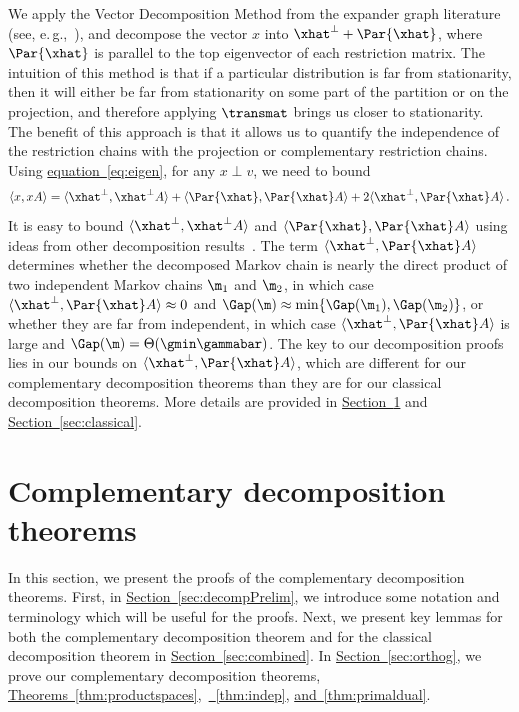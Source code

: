 \documentclass[11pt]{article}
\providecommand{\eg}{e.\,g.}
\providecommand{\expref}[2]{\texorpdfstring{\hyperref[#2]{#1~\ref{#2}}}{#1~\ref{#2}}}
\providecommand{\expeqref}[2]{\texorpdfstring{\hyperref[#2]{#1~\eqref{#2}}}{#1~\eqref{#2}}}
\providecommand{\Perp}[1]{#1^{\perp}}
\begin{document}
We apply the Vector Decomposition Method from the expander graph 
literature (see, \eg,~\cite{RVW, expander-book}), and decompose the 
vector $x$ into $\Perp{\xhat}+\Par{\xhat}$, where $\Par{\xhat}$ is 
parallel to the top eigenvector of each restriction matrix.  The 
intuition of this method is that if a particular distribution is far 
from stationarity, then it will either be far from stationarity on some 
part of the partition or on the projection, and therefore applying 
$\transmat$ brings us closer to stationarity. The benefit of this 
approach is that it allows us to quantify the independence of the 
restriction chains with the projection or complementary restriction chains.
Using 
\expeqref{equation}{eq:eigen}, for any $x\perp v$, we need to bound 
\begin{equation}\label{eq:split}
\langle x, xA\rangle = \langle \Perp{\xhat},\Perp{\xhat}A\rangle + 
\langle\Par{\xhat},\Par{\xhat}A\rangle + 2\langle \Perp{\xhat},\Par{\xhat}A\rangle\,.
\end{equation}
It is easy to bound $\langle \Perp{\xhat},\Perp{\xhat}A\rangle$ and 
$\langle\Par{\xhat},\Par{\xhat}A\rangle$ using ideas from other 
decomposition results~\cite{jstv04, MR00}. The term $\langle 
\Perp{\xhat},\Par{\xhat}A\rangle$ determines whether the decomposed 
Markov chain is nearly the direct product of two independent Markov 
chains $\m_1$ and $\m_2$, in which case $\langle 
\Perp{\xhat},\Par{\xhat}A\rangle\approx0$ and $\Gap(\m)\approx 
\min\{\Gap(\m_1),\Gap(\m_2)\}$, or whether they are far from 
independent, in which case $\langle \Perp{\xhat},\Par{\xhat}A\rangle$ 
is large and $\Gap(\m)=\Theta(\gmin \gammabar)$.  The key to our 
decomposition proofs lies in our bounds on $\langle 
\Perp{\xhat},\Par{\xhat}A\rangle$, which are different for our 
complementary decomposition theorems than they are for our classical 
decomposition theorems.   More details are provided in \expref{Section}{sec:decompProofs} and \expref{Section}{sec:classical}.

\section{Complementary decomposition theorems}\label{sec:decompProofs} 


In this section, we present the proofs of the complementary 
decomposition theorems.  First, in \expref{Section}{sec:decompPrelim}, we 
introduce some notation and terminology which will be useful for the 
proofs.  Next, we present key lemmas for both the complementary 
decomposition theorem and for the classical decomposition theorem in 
\expref{Section}{sec:combined}. In \expref{Section}{sec:orthog}, we prove our 
complementary decomposition theorems, 
\expref{Theorems}{thm:productspaces},~\expref{}{thm:indep}, 
\expref{and}{thm:primaldual}.  
\end{document}
